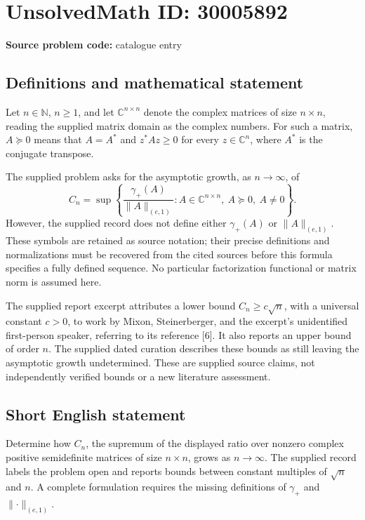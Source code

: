 \documentclass[11pt]{article}
\newcommand{\N}{\mathbb{N}}
\newcommand{\C}{\mathbb{C}}
\begin{document}
\section*{UnsolvedMath ID: 30005892}
\textbf{Source problem code:} catalogue entry
\subsection{Definitions and mathematical statement}
Let \(n\in\N\), \(n\geq1\), and let \(\C^{n\times n}\) denote the complex matrices of size \(n\times n\), reading the supplied matrix domain as the complex numbers. For such a matrix, \(A\succeq0\) means that \(A=A^*\) and \(z^*Az\geq0\) for every \(z\in\C^n\), where \(A^*\) is the conjugate transpose.

The supplied problem asks for the asymptotic growth, as \(n\to\infty\), of
\[
C_n=\sup\left\{\frac{\gamma_+(A)}{\lVert A\rVert_{(e,1)}}:A\in\C^{n\times n},\ A\succeq0,\ A\neq0\right\}.
\]
However, the supplied record does not define either \(\gamma_+(A)\) or \(\lVert A\rVert_{(e,1)}\). These symbols are retained as source notation; their precise definitions and normalizations must be recovered from the cited sources before this formula specifies a fully defined sequence. No particular factorization functional or matrix norm is assumed here.

The supplied report excerpt attributes a lower bound \(C_n\geq c\sqrt n\), with a universal constant \(c>0\), to work by Mixon, Steinerberger, and the excerpt's unidentified first-person speaker, referring to its reference [6]. It also reports an upper bound of order \(n\). The supplied dated curation describes these bounds as still leaving the asymptotic growth undetermined. These are supplied source claims, not independently verified bounds or a new literature assessment.
\subsection{Short English statement}
Determine how \(C_n\), the supremum of the displayed ratio over nonzero complex positive semidefinite matrices of size \(n\times n\), grows as \(n\to\infty\). The supplied record labels the problem open and reports bounds between constant multiples of \(\sqrt n\) and \(n\). A complete formulation requires the missing definitions of \(\gamma_+\) and \(\lVert\cdot\rVert_{(e,1)}\).
\end{document}
